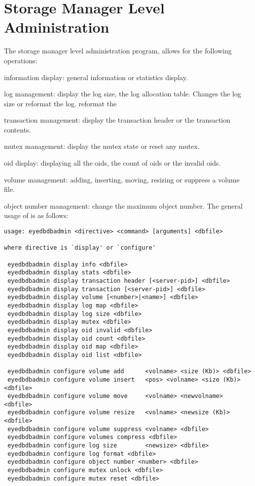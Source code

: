 \section{Storage Manager Level Administration}
The storage manager level administration program, 
allows for the following operations:
\be
\item information display: general information or statistics display.
\item log management: display the log size, the log allocation table.
Changes the log size or reformat the log.
reformat the
\item transaction management: display the transaction header or the
transaction contents.
\item mutex management: display the mutex state or reset any mutex.
\item oid display: displaying all the oids, the count of oids or the
invalid oids.
\item volume management: adding, inserting, moving, resizing or
suppress a volume file.
\item object number management: change the maximum object number.
\ee
The general usage of  is as follows:
\verbsize
\begin{verbatim}
usage: eyedbdbadmin <directive> <command> [arguments] <dbfile>

where directive is `display' or `configure'

 eyedbdbadmin display info <dbfile>
 eyedbdbadmin display stats <dbfile>
 eyedbdbadmin display transaction header [<server-pid>] <dbfile>
 eyedbdbadmin display transaction [<server-pid>] <dbfile>
 eyedbdbadmin display volume [<number>|<name>] <dbfile>
 eyedbdbadmin display log map <dbfile>
 eyedbdbadmin display log size <dbfile>
 eyedbdbadmin display mutex <dbfile>
 eyedbdbadmin display oid invalid <dbfile>
 eyedbdbadmin display oid count <dbfile>
 eyedbdbadmin display oid map <dbfile>
 eyedbdbadmin display oid list <dbfile>
 
 eyedbdbadmin configure volume add      <volname> <size (Kb)> <dbfile>
 eyedbdbadmin configure volume insert   <pos> <volname> <size (Kb)> <dbfile>
 eyedbdbadmin configure volume move     <volname> <newvolname> <dbfile>
 eyedbdbadmin configure volume resize   <volname> <newsize (Kb)> <dbfile>
 eyedbdbadmin configure volume suppress <volname> <dbfile>
 eyedbdbadmin configure volumes compress <dbfile>
 eyedbdbadmin configure log size        <newsize> <dbfile>
 eyedbdbadmin configure log format <dbfile>
 eyedbdbadmin configure object number <number> <dbfile>
 eyedbdbadmin configure mutex unlock <dbfile>
 eyedbdbadmin configure mutex reset <dbfile>
\end{verbatim}
\normalsize

